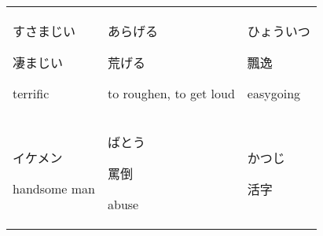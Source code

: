 \documentclass[12pt, a4j, landscape, dvipdfmx]{utarticle}
\begin{document}
    
    \begin{minipage}[t][0pt]{\linewidth }
        \noindent 
        \begin{tabular}{||p{5.5cm}||p{5.5cm}||p{5.5cm}||}
            \hhline{|t:=:t:=:t:=:t|} \rule{0pt}{3ex}
            \hspace*{-.4cm} {\LARGE すさまじい}\newline
            \rule{0pt}{3ex} \hspace*{.4cm} {\small
            凄まじい}\newline \rule{0pt}{3ex} \hspace*{.425cm}
            {\small terrific}&\rule{0pt}{3ex}
            \hspace*{-.4cm} {\LARGE あらげる}\newline
            \rule{0pt}{3ex} \hspace*{.4cm} {\small
            荒げる}\newline \rule{0pt}{3ex} \hspace*{.425cm}
            {\small to roughen, to get loud}&\rule{0pt}{3ex}
            \hspace*{-.4cm} {\LARGE ひょういつ}\newline
            \rule{0pt}{3ex} \hspace*{.4cm} {\small
            飄逸}\newline \rule{0pt}{3ex} \hspace*{.425cm}
            {\small easygoing}\tabularnewline
            \hhline{|:=::=::=:|} \rule{0pt}{3ex}
            \hspace*{-.4cm} {\LARGE イケメン}\newline
            \rule{0pt}{3ex} \hspace*{.4cm} {\small }\newline
            \rule{0pt}{3ex} \hspace*{.425cm} {\small
            handsome man}&\rule{0pt}{3ex} \hspace*{-.4cm}
            {\LARGE ばとう}\newline \rule{0pt}{3ex}
            \hspace*{.4cm} {\small 罵倒}\newline
            \rule{0pt}{3ex} \hspace*{.425cm} {\small
            abuse}&\rule{0pt}{3ex} \hspace*{-.4cm} {\LARGE
            かつじ}\newline \rule{0pt}{3ex} \hspace*{.4cm}
            {\small 活字}\newline \rule{0pt}{3ex}

\end{tabular}
\end{minipage}
\end{document}

